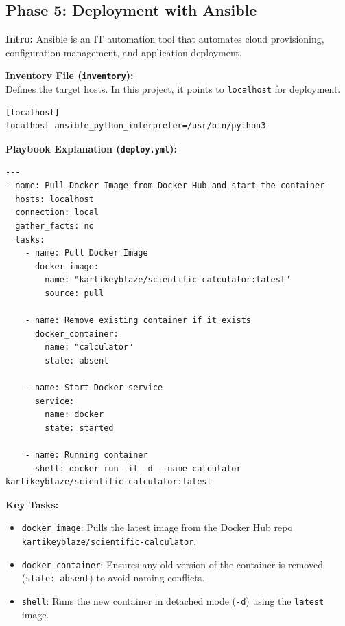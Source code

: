 \documentclass[12pt,a4paper]{article}
\begin{document}

\subsection{Phase 5: Deployment with Ansible}

\textbf{Intro:} Ansible is an IT automation tool that automates cloud provisioning, configuration management, and application deployment.

\textbf{Inventory File (\texttt{inventory}):}\\
Defines the target hosts. In this project, it points to \texttt{localhost} for deployment.
\begin{verbatim}
[localhost]
localhost ansible_python_interpreter=/usr/bin/python3
\end{verbatim}

\textbf{Playbook Explanation (\texttt{deploy.yml}):}
\begin{verbatim}
---
- name: Pull Docker Image from Docker Hub and start the container
  hosts: localhost
  connection: local
  gather_facts: no
  tasks:
    - name: Pull Docker Image
      docker_image:
        name: "kartikeyblaze/scientific-calculator:latest"
        source: pull

    - name: Remove existing container if it exists
      docker_container:
        name: "calculator"
        state: absent

    - name: Start Docker service
      service:
        name: docker
        state: started

    - name: Running container
      shell: docker run -it -d --name calculator kartikeyblaze/scientific-calculator:latest
\end{verbatim}

\textbf{Key Tasks:}
\begin{itemize}[noitemsep]
  \item \texttt{docker\_image}: Pulls the latest image from the Docker Hub repo \texttt{kartikeyblaze/scientific-calculator}.
  \item \texttt{docker\_container}: Ensures any old version of the container is removed (\texttt{state: absent}) to avoid naming conflicts.
  \item \texttt{shell}: Runs the new container in detached mode (\texttt{-d}) using the \texttt{latest} image.
\end{itemize}

\end{document}

